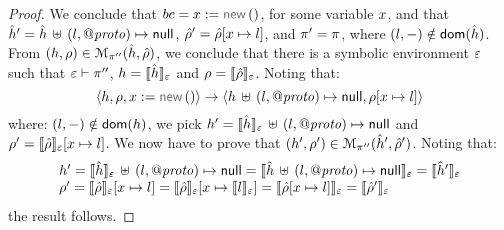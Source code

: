 \begin{proof}
\noindent{}
We conclude that $\bcmd = \jvar := \jsilnew()$, for some variable $\jvar$, and that
$\sheap' = \sheap \dunion \hcell{\loc}{\protop}{\jsnull}$, $\sstore' = \sstore[\jvar \mapsto \loc]$, and $\pc' = \pc$, 
 where  $(\loc,-) \notin \domain (\sheap)$. 
 From $(\heap, \store) \in \smodels{\sheap, \sstore}{\pc''}$, we conclude that there is a symbolic environment
$\senv$ such that $\senv \vdash \pc''$, $\heap = \semexpr{\sheap}{\senv}$ and $\store = \semexpr{\sstore}{\senv}$. 
Noting that: 
$$
\semtrans{\heap, \store, \jvar := \jsilnew()}{\heap \dunion \hcell{\loc}{\protop}{\jsnull}, \store[\jvar \mapsto \loc]}
$$
where: $(\loc,-) \notin \domain (\heap)$, we pick $\heap' = \semexpr{\sheap}{\senv} \dunion \hcell{\loc}{\protop}{\jsnull}$ 
and $\store' = \semexpr{\sstore}{\senv}[\jvar \mapsto \loc]$. 
We now have to prove that $(\heap', \store') \in \smodels{\sheap', \sstore'}{\pc''}$.
Noting that: 
$$
\begin{array}{l}
\heap' = \semexpr{\sheap}{\senv} \dunion \hcell{\loc}{\protop}{\jsnull} = \semexpr{\sheap \dunion \hcell{\loc}{\protop}{\jsnull}}{\senv}   
     = \semexpr{\sheap'}{\senv}  \\
%
\store' = \semexpr{\sstore}{\senv}[\jvar \mapsto \loc] = \semexpr{\sstore}{\senv}[\jvar \mapsto \symbeval{\loc}{\senv}] = 
      \semexpr{\sstore[\jvar \mapsto \loc]}{\senv} = \semexpr{\sstore'}{\senv} 
\end{array}
$$
the result follows. 
\vspace{6pt}


\end{proof}

